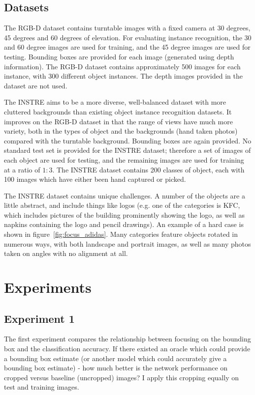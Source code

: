 \subsection{Datasets}

The RGB-D \cite{Lai2011} dataset contains turntable images with a fixed camera at 30 degrees, 45 degrees and 60 degrees of elevation. For evaluating instance recognition, the 30 and 60 degree images are used for training, and the 45 degree images are used for testing. Bounding boxes are provided for each image (generated using depth information). The RGB-D dataset contains approximately 500 images for each instance, with 300 different object instances.  The depth images provided in the dataset are not used.

The INSTRE \cite{Wang2015} aims to be a more diverse, well-balanced dataset with more cluttered backgrounds than existing object instance recognition datasets. It improves on the RGB-D dataset in that the range of views have much more variety, both in the types of object and the backgrounds (hand taken photos) compared with the turntable background. Bounding boxes are again provided. No standard test set is provided for the INSTRE dataset; therefore a set of images of each object are used for testing, and the remaining images are used for training at a ratio of $1:3$. The INSTRE dataset contains 200 classes of object, each with 100 images which have either been hand captured or picked. 

The INSTRE dataset contains unique challenges. A number of the objects are a little abstract, and include things like logos (e.g. one of the categories is KFC, which includes pictures of the building prominently showing the logo, as well as napkins containing the logo and pencil drawings). An example of a hard case is shown in figure~\ref{fig:focus_adidas}. Many categories feature objects rotated in numerous ways, with both landscape and portrait images, as well as many photos taken on angles with no alignment at all.

\section {Experiments}


\subsection {Experiment 1}

The first experiment compares the relationship between focusing on the bounding box and the classification accuracy. If there existed an oracle which could provide a bounding box estimate (or another model which could accurately give a bounding box estimate) - how much better is the network performance on cropped versus baseline (uncropped) images? I apply this cropping equally on test and training images.

